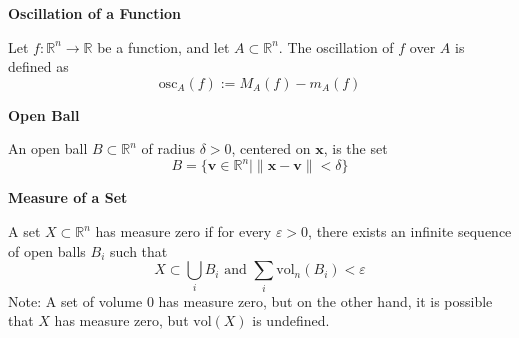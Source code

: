 \documentclass{article}
\newcommand{\R}{\mathbb{R}}
\newenvironment{definition}[1]{
    \par\noindent\textbf{#1}\par\noindent
}{
    \par \vspace{0.5cm}
}
\begin{document}
\begin{definition}{Oscillation of a Function}
    Let \( f : \R^n \to \R \) be a function, and let \( A \subset \R^n \). The oscillation of \( f \) over \( A \) is defined as
    \[ \text{osc}_A(f) := M_A(f) - m_A(f) \]
\end{definition}


\begin{definition}{Open Ball}
    An open ball \( B \subset \R^n \) of radius \( \delta > 0 \), centered on \( \bm{x} \), is the set
    \[ B = \{\bm{v} \in \R^n \mid \|\bm{x} - \bm{v}\| < \delta\} \]
\end{definition}

\begin{definition}{Measure of a Set}
    A set \( X \subset \R^n \) has measure zero if for every \( \varepsilon > 0 \), there exists an infinite sequence of open balls \( B_i \) such that
    \[ X \subset \bigcup_i B_i \text{ and } \sum_i \text{vol}_n(B_i) < \varepsilon \]
    Note: A set of volume 0 has measure zero, but on the other hand, it is possible that \( X \) has measure zero, but \( \text{vol}(X) \) is undefined.
\end{definition}
\end{document}
